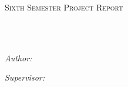 \documentclass[
11pt, %
oneside, %
english, %
singlespacing, %
headsepline, %
]{thesis} %
\author{Ashish \textsc{Panigrahi}} %
\begin{document}
\frontmatter %

\pagestyle{plain} %


\begin{titlepage}
\begin{center}

\vspace*{.06\textheight}
{\scshape\LARGE \univname\par}\vspace{1.5cm} %
\textsc{\Large Sixth Semester Project Report}\\[0.5cm] %

\HRule \\[0.4cm] %
{\huge \bfseries \ttitle\par}\vspace{0.4cm} %
\HRule \\[1.5cm] %

\begin{minipage}[t]{0.4\textwidth}
\begin{flushleft} \large
\emph{Author:}\\
{\authorname} %
\end{flushleft}
\end{minipage}
\begin{minipage}[t]{0.4\textwidth}
\begin{flushright} \large
\emph{Supervisor:} \\
{\supname} %
\end{flushright}
\end{minipage}\\[2cm]


\end{center}
\end{titlepage}
\end{document}
